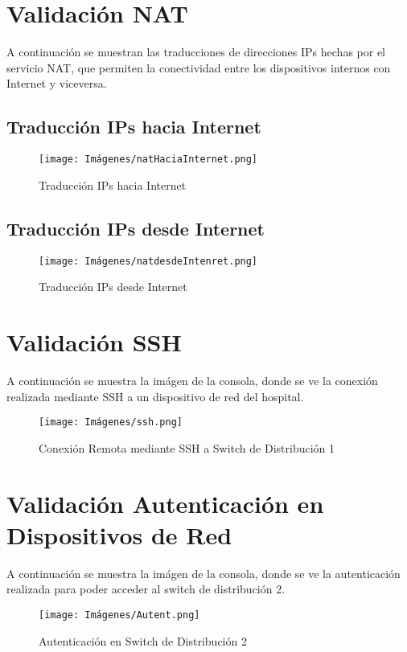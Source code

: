 \section{Validación NAT}
A continuación se muestran las traducciones de direcciones IPs hechas por el servicio NAT, que permiten la conectividad entre los dispositivos internos con Internet y viceversa.
\subsection{Traducción IPs hacia Internet}\label{anexo:haciaInt}
\begin{figure}[H]
    \centering
    \texttt{[image: Imágenes/natHaciaInternet.png]}
    \caption{Traducción IPs hacia Internet}
\end{figure}
\subsection{Traducción IPs desde Internet}\label{anexo:desdeInt}
\begin{figure}[H]
    \centering
    \texttt{[image: Imágenes/natdesdeIntenret.png]}
    \caption{Traducción IPs desde Internet}
\end{figure}

\section{Validación SSH}\label{anexo:pruebaSSH}
A continuación se muestra la imágen de la consola, donde se ve la conexión realizada mediante SSH a un dispositivo de red del hospital.
\begin{figure}[H]
    \centering
    \texttt{[image: Imágenes/ssh.png]}
    \caption{Conexión Remota mediante SSH a Switch de Distribución 1}
\end{figure}

\section{Validación Autenticación en Dispositivos de Red}\label{anexo:pruebaAutent}
A continuación se muestra la imágen de la consola, donde se ve la autenticación realizada para poder acceder al switch de distribución 2.
\begin{figure}[H]
    \centering
    \texttt{[image: Imágenes/Autent.png]}
    \caption{Autenticación en Switch de Distribución 2}
\end{figure}

